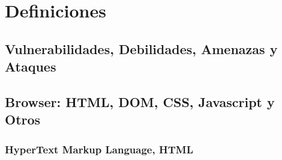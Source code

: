 \label{chap:chap2}

\section{Definiciones}
\label{sec:chap2.1}

\subsection{Vulnerabilidades, Debilidades, Amenazas y Ataques}
\label{sec:chap2.1.1}






\subsection{Browser: HTML, DOM, CSS, Javascript y Otros}
\label{sec:chap2.1.2}


\subsubsection{HyperText Markup Language, HTML}
\label{sec:chap2.1.2.1}


